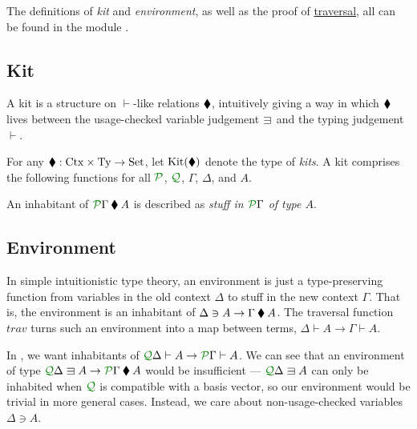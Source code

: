 \documentclass[submission,copyright,creativecommons]{eptcs}
\begin{document}
The definitions of \emph{kit} and \emph{environment}, as well as the proof of
\hyperref[thm:trav]{traversal}, all can be found in the module
.

\subsection{Kit}

A kit is a structure on $\vdash$-like relations $\mathbin{\blacklozenge}$, intuitively
giving a way in which $\mathbin{\blacklozenge}$ lives between the usage-checked variable
judgement $\lvar$ and the typing judgement $\vdash$.

\begin{definition}\label{def:kit}
  For any $\mathbin{\blacklozenge} : \mathrm{Ctx} \times \mathrm{Ty} \to \mathrm{Set}$, let
  $\operatorname{Kit}(\mathbin{\blacklozenge})$ denote the type of \emph{kits}.
  A kit comprises the following functions for all $\resctx P$, $\resctx Q$,
  $\Gamma$, $\Delta$, and $A$.

\end{definition}

An inhabitant of $\ctx{\Gamma}{P} \kitrel A$ is described as
\emph{stuff in $\ctx{\Gamma}{P}$ of type $A$}.

\subsection{Environment}

In simple intuitionistic type theory, an environment is just a type-preserving
function from variables in the old context $\Delta$ to stuff in the new context
$\Gamma$.
That is, the environment is an inhabitant of
$\Delta \ni A \to \Gamma \mathbin{\blacklozenge} A$.
The traversal function $\mathit{trav}$ turns such an environment into a map
between terms, $\Delta \vdash A \to \Gamma \vdash A$.

In \name{}, we want inhabitants of
$\ctx{\Delta}{Q} \vdash A \to \ctx{\Gamma}{P} \vdash A$.
We can see that an environment of type
$\ctx{\Delta}{Q} \lvar A \to \ctx{\Gamma}{P} \kitrel A$ would
be insufficient --- $\ctx{\Delta}{Q} \lvar A$ can only be inhabited when
$\resctx Q$ is compatible with a basis vector, so our environment would be
trivial in more general cases.
Instead, we care about non-usage-checked variables $\Delta \ni A$.
\end{document}
